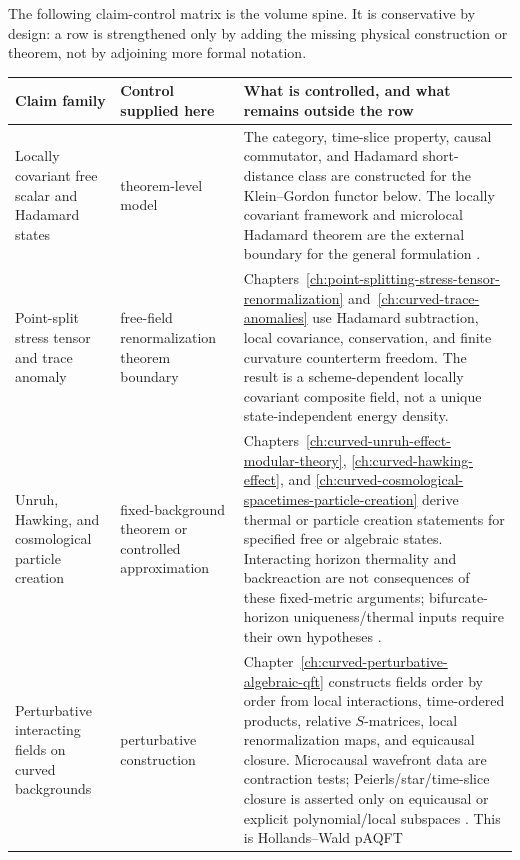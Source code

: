 The following claim-control matrix is the volume spine.  It is conservative
by design: a row is strengthened only by adding the missing physical
construction or theorem, not by adjoining more formal notation.
\begin{center}
\small
\renewcommand{\arraystretch}{1.12}
\begin{tabular}{@{}>{\raggedright\arraybackslash}p{}
  >{\raggedright\arraybackslash}p{}
  >{\raggedright\arraybackslash}p{}@{}}
\textbf{Claim family} & \textbf{Control supplied here} & \textbf{What is
controlled, and what remains outside the row} \\
\hline
Locally covariant free scalar and Hadamard states
& theorem-level model
& The category, time-slice property, causal commutator, and Hadamard
short-distance class are constructed for the Klein--Gordon functor below.
The locally covariant framework and microlocal Hadamard theorem are the
external boundary for the general formulation
\cite{BrunettiFredenhagenVerch2003,Radzikowski1996}. \\
Point-split stress tensor and trace anomaly
& free-field renormalization theorem boundary
& Chapters~\ref{ch:point-splitting-stress-tensor-renormalization}
and~\ref{ch:curved-trace-anomalies} use Hadamard subtraction, local
covariance, conservation, and finite curvature counterterm freedom.  The
result is a scheme-dependent locally covariant composite field, not a unique
state-independent energy density. \\
Unruh, Hawking, and cosmological particle creation
& fixed-background theorem or controlled approximation
& Chapters~\ref{ch:curved-unruh-effect-modular-theory},
\ref{ch:curved-hawking-effect}, and
\ref{ch:curved-cosmological-spacetimes-particle-creation} derive thermal or particle
creation statements for specified free or algebraic states.  Interacting
horizon thermality and backreaction are not consequences of these fixed-metric
arguments; bifurcate-horizon uniqueness/thermal inputs require their own
hypotheses \cite{KayWald1991}. \\
Perturbative interacting fields on curved backgrounds
& perturbative construction
& Chapter~\ref{ch:curved-perturbative-algebraic-qft} constructs fields order
by order from local interactions, time-ordered products, relative
\(S\)-matrices, local renormalization maps, and equicausal closure.  Microcausal
wavefront data are contraction tests; Peierls/star/time-slice closure is
asserted only on equicausal or explicit polynomial/local subspaces
\cite{HawkinsRejznerVisser2024Equicausal}.  This is Hollands--Wald pAQFT

\end{tabular}
\end{center}
